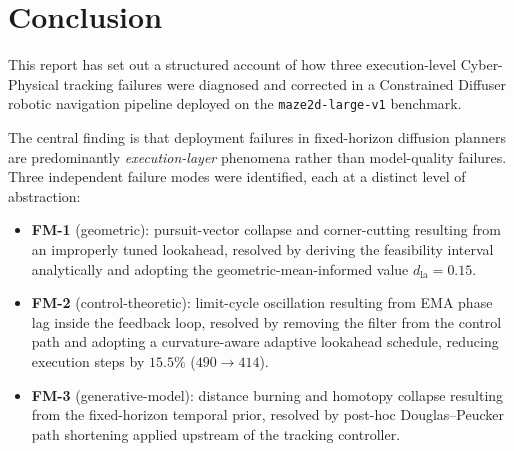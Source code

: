 \documentclass[12pt, a4paper, oneside]{report}
\theoremstyle{definition}
\newcommand{\dlookahead}{d_{\mathrm{la}}}
\begin{document}
\chapter{Conclusion}
\label{chap:conclusion}

This report has set out a structured account of how three
execution-level Cyber-Physical tracking failures were diagnosed
and corrected in a Constrained Diffuser robotic navigation
pipeline deployed on the \texttt{maze2d-large-v1} benchmark.

The central finding is that deployment failures in fixed-horizon
diffusion planners are predominantly \emph{execution-layer}
phenomena rather than model-quality failures. Three independent
failure modes were identified, each at a distinct level of
abstraction:
\begin{itemize}[itemsep=3pt]
  \item \textbf{FM-1} (geometric): pursuit-vector collapse and
        corner-cutting resulting from an improperly tuned
        lookahead, resolved by deriving the feasibility interval
        analytically and adopting the geometric-mean-informed
        value $\dlookahead = 0.15$.
  \item \textbf{FM-2} (control-theoretic): limit-cycle oscillation
        resulting from EMA phase lag inside the feedback loop,
        resolved by removing the filter from the control path and
        adopting a curvature-aware adaptive lookahead schedule,
        reducing execution steps by $15.5\%$ ($490 \to 414$).
  \item \textbf{FM-3} (generative-model): distance burning and
        homotopy collapse resulting from the fixed-horizon temporal
        prior, resolved by post-hoc Douglas--Peucker path
        shortening applied upstream of the tracking controller.
\end{itemize}
\end{document}

